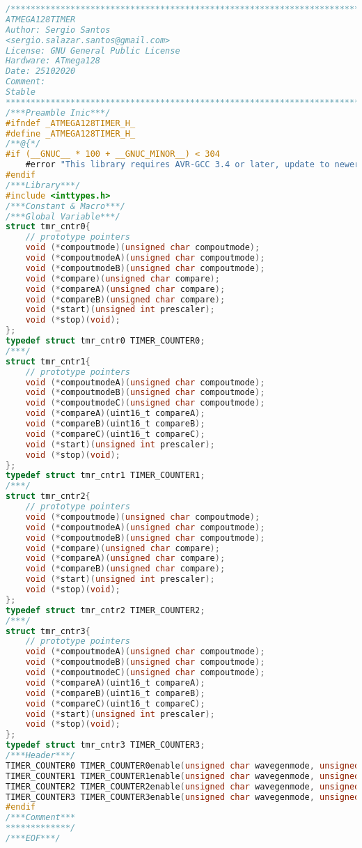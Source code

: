 \begin{lstlisting}[language=C, caption={atmega128timer.h}, label=atmega128timer-h, captionpos=b]
/************************************************************************
ATMEGA128TIMER
Author: Sergio Santos 
<sergio.salazar.santos@gmail.com>
License: GNU General Public License
Hardware: ATmega128
Date: 25102020
Comment:
Stable
************************************************************************/
/***Preamble Inic***/
#ifndef _ATMEGA128TIMER_H_
#define _ATMEGA128TIMER_H_
/**@{*/
#if (__GNUC__ * 100 + __GNUC_MINOR__) < 304
	#error "This library requires AVR-GCC 3.4 or later, update to newer AVR-GCC compiler !"
#endif
/***Library***/
#include <inttypes.h>
/***Constant & Macro***/
/***Global Variable***/
struct tmr_cntr0{
	// prototype pointers
	void (*compoutmode)(unsigned char compoutmode);
	void (*compoutmodeA)(unsigned char compoutmode);
	void (*compoutmodeB)(unsigned char compoutmode);
	void (*compare)(unsigned char compare);
	void (*compareA)(unsigned char compare);
	void (*compareB)(unsigned char compare);
	void (*start)(unsigned int prescaler);
	void (*stop)(void);
};
typedef struct tmr_cntr0 TIMER_COUNTER0;
/***/
struct tmr_cntr1{
	// prototype pointers
	void (*compoutmodeA)(unsigned char compoutmode);
	void (*compoutmodeB)(unsigned char compoutmode);
	void (*compoutmodeC)(unsigned char compoutmode);
	void (*compareA)(uint16_t compareA);
	void (*compareB)(uint16_t compareB);
	void (*compareC)(uint16_t compareC);
	void (*start)(unsigned int prescaler);
	void (*stop)(void);
};
typedef struct tmr_cntr1 TIMER_COUNTER1;
/***/
struct tmr_cntr2{
	// prototype pointers
	void (*compoutmode)(unsigned char compoutmode);
	void (*compoutmodeA)(unsigned char compoutmode);
	void (*compoutmodeB)(unsigned char compoutmode);
	void (*compare)(unsigned char compare);
	void (*compareA)(unsigned char compare);
	void (*compareB)(unsigned char compare);
	void (*start)(unsigned int prescaler);
	void (*stop)(void);
};
typedef struct tmr_cntr2 TIMER_COUNTER2;
/***/
struct tmr_cntr3{
	// prototype pointers
	void (*compoutmodeA)(unsigned char compoutmode);
	void (*compoutmodeB)(unsigned char compoutmode);
	void (*compoutmodeC)(unsigned char compoutmode);
	void (*compareA)(uint16_t compareA);
	void (*compareB)(uint16_t compareB);
	void (*compareC)(uint16_t compareC);
	void (*start)(unsigned int prescaler);
	void (*stop)(void);
};
typedef struct tmr_cntr3 TIMER_COUNTER3;
/***Header***/
TIMER_COUNTER0 TIMER_COUNTER0enable(unsigned char wavegenmode, unsigned char interrupt);
TIMER_COUNTER1 TIMER_COUNTER1enable(unsigned char wavegenmode, unsigned char interrupt);
TIMER_COUNTER2 TIMER_COUNTER2enable(unsigned char wavegenmode, unsigned char interrupt);
TIMER_COUNTER3 TIMER_COUNTER3enable(unsigned char wavegenmode, unsigned char interrupt);
#endif
/***Comment***
*************/
/***EOF***/
\end{lstlisting}
